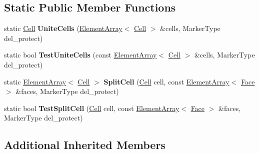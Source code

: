 \subsection*{Static Public Member Functions}
\begin{DoxyCompactItemize}
\item 
\hypertarget{classINMOST_1_1Cell_a7f38ec05ba41d633d48bf05cdf2d0aad}{static \hyperlink{classINMOST_1_1Cell}{Cell} {\bfseries Unite\-Cells} (\hyperlink{classINMOST_1_1ElementArray}{Element\-Array}$<$ \hyperlink{classINMOST_1_1Cell}{Cell} $>$ \&cells, Marker\-Type del\-\_\-protect)}\label{classINMOST_1_1Cell_a7f38ec05ba41d633d48bf05cdf2d0aad}

\item 
\hypertarget{classINMOST_1_1Cell_a874821b6ed2fd2907509146651312062}{static bool {\bfseries Test\-Unite\-Cells} (const \hyperlink{classINMOST_1_1ElementArray}{Element\-Array}$<$ \hyperlink{classINMOST_1_1Cell}{Cell} $>$ \&cells, Marker\-Type del\-\_\-protect)}\label{classINMOST_1_1Cell_a874821b6ed2fd2907509146651312062}

\item 
\hypertarget{classINMOST_1_1Cell_afd127d2e41a4b4362dc3399d9ac96a59}{static \hyperlink{classINMOST_1_1ElementArray}{Element\-Array}$<$ \hyperlink{classINMOST_1_1Cell}{Cell} $>$ {\bfseries Split\-Cell} (\hyperlink{classINMOST_1_1Cell}{Cell} cell, const \hyperlink{classINMOST_1_1ElementArray}{Element\-Array}$<$ \hyperlink{classINMOST_1_1Face}{Face} $>$ \&faces, Marker\-Type del\-\_\-protect)}\label{classINMOST_1_1Cell_afd127d2e41a4b4362dc3399d9ac96a59}

\item 
\hypertarget{classINMOST_1_1Cell_ae48af9bae603442a3dccc81e39b18eb0}{static bool {\bfseries Test\-Split\-Cell} (\hyperlink{classINMOST_1_1Cell}{Cell} cell, const \hyperlink{classINMOST_1_1ElementArray}{Element\-Array}$<$ \hyperlink{classINMOST_1_1Face}{Face} $>$ \&faces, Marker\-Type del\-\_\-protect)}\label{classINMOST_1_1Cell_ae48af9bae603442a3dccc81e39b18eb0}

\end{DoxyCompactItemize}
\subsection*{Additional Inherited Members}


